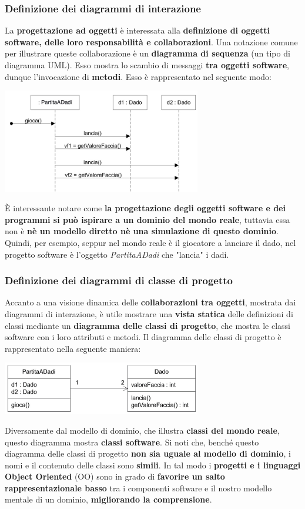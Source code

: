 \documentclass[12pt]{article}
\begin{document}
\subsubsection{Definizione dei diagrammi di interazione}
La \textbf{progettazione ad oggetti} è interessata alla \textbf{definizione di oggetti software, delle loro responsabilità e collaborazioni}. Una notazione comune per illustrare queste collaborazione è un
\textbf{diagramma di sequenza} (un tipo di diagramma UML). Esso mostra lo scambio di messaggi \textbf{tra oggetti software}, dunque l'invocazione di \textbf{metodi}. Esso è rappresentato nel seguente modo:
\begin{center}
    \includegraphics[width = 0.65\textwidth]{Images/8.png}
\end{center}
È interessante notare come \textbf{la progettazione degli oggetti software e dei programmi si può ispirare a un dominio del mondo reale}, tuttavia essa non è \textbf{nè un modello diretto nè una simulazione di questo dominio}. Quindi, per esempio,
seppur nel mondo reale è il giocatore a lanciare il dado, nel progetto software è l'oggetto \textit{PartitaADadi} che "lancia" i dadi.
\subsubsection{Definizione dei diagrammi di classe di progetto}
Accanto a una visione dinamica delle \textbf{collaborazioni tra oggetti}, mostrata dai diagrammi di interazione, è utile mostrare una \textbf{vista statica} delle definizioni di classi mediante un \textbf{diagramma delle classi di progetto}, che mostra le classi software 
con i loro attributi e metodi. Il diagramma delle classi di progetto è rappresentato nella seguente maniera:
\begin{center}
    \includegraphics[width = 0.65\textwidth]{Images/9.png}
\end{center}
Diversamente dal modello di dominio, che illustra \textbf{classi del mondo reale}, questo diagramma mostra \textbf{classi software}.
Si noti che, benché questo diagramma delle classi di progetto \textbf{non sia uguale al modello di dominio}, i nomi e il contenuto delle classi sono \textbf{simili}. In tal modo i \textbf{progetti e i linguaggi Object Oriented} (OO) sono in grado di \textbf{favorire un salto rappresentazionale basso}
tra i componenti software e il nostro modello mentale di un dominio, \textbf{migliorando la comprensione}.
\end{document}
